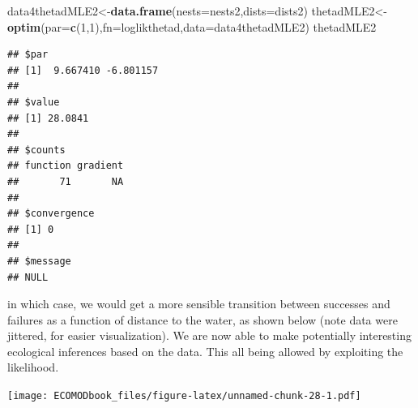 \documentclass[
]{book}
\newenvironment{Shaded}{\begin{snugshade}}{\end{snugshade}}
\newcommand{\AttributeTok}[1]{\textcolor[rgb]{0.13,0.29,0.53}{#1}}
\newcommand{\DecValTok}[1]{\textcolor[rgb]{0.00,0.00,0.81}{#1}}
\newcommand{\FloatTok}[1]{\textcolor[rgb]{0.00,0.00,0.81}{#1}}
\newcommand{\FunctionTok}[1]{\textcolor[rgb]{0.13,0.29,0.53}{\textbf{#1}}}
\newcommand{\NormalTok}[1]{#1}
\newcommand{\OtherTok}[1]{\textcolor[rgb]{0.56,0.35,0.01}{#1}}
\newcommand{\SpecialCharTok}[1]{\textcolor[rgb]{0.81,0.36,0.00}{\textbf{#1}}}
\newcommand{\StringTok}[1]{\textcolor[rgb]{0.31,0.60,0.02}{#1}}
\begin{document}
\begin{Shaded}
\begin{Highlighting}[]
\NormalTok{data4thetadMLE2}\OtherTok{\textless{}{-}}\FunctionTok{data.frame}\NormalTok{(}\AttributeTok{nests=}\NormalTok{nests2,}\AttributeTok{dists=}\NormalTok{dists2)}
\NormalTok{thetadMLE2}\OtherTok{\textless{}{-}}\FunctionTok{optim}\NormalTok{(}\AttributeTok{par=}\FunctionTok{c}\NormalTok{(}\DecValTok{1}\NormalTok{,}\DecValTok{1}\NormalTok{),}\AttributeTok{fn=}\NormalTok{loglikthetad,}\AttributeTok{data=}\NormalTok{data4thetadMLE2)}
\NormalTok{thetadMLE2}
\end{Highlighting}
\end{Shaded}

\begin{verbatim}
## $par
## [1]  9.667410 -6.801157
## 
## $value
## [1] 28.0841
## 
## $counts
## function gradient 
##       71       NA 
## 
## $convergence
## [1] 0
## 
## $message
## NULL
\end{verbatim}

in which case, we would get a more sensible transition between successes and failures as a function of distance to the water, as shown below (note data were jittered, for easier visualization). We are now able to make potentially interesting ecological inferences based on the data. This all being allowed by exploiting the likelihood.

\begin{Shaded}
\end{Shaded}

\texttt{[image: ECOMODbook\_files/figure-latex/unnamed-chunk-28-1.pdf]}
\end{document}
